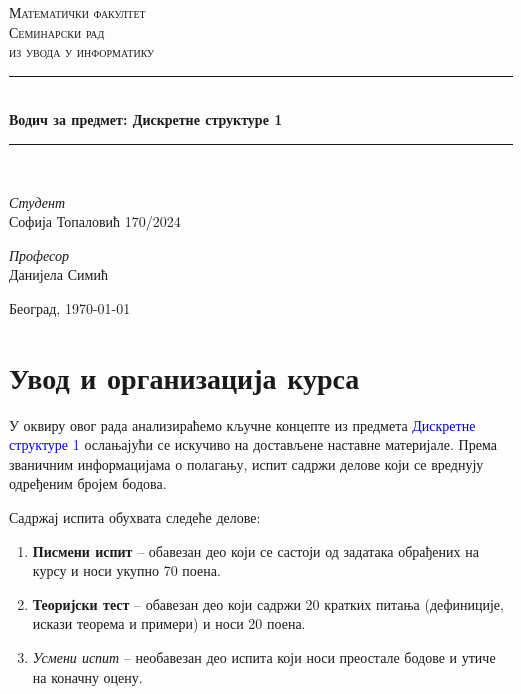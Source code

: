 \documentclass[12pt, a4paper]{article}
\theoremstyle{definition}
\begin{document}
\begin{titlepage}
    \newcommand{\HRule}{\rule{\linewidth}{0.4mm}}
    \center    	
    \textsc{\LARGE Математички факултет}\\[3cm]     	
    \textsc{\Large Семинарски рад}\\[0.1cm]    	
    \textsc{\large из увода у информатику}\\[0.5cm]     	
    \HRule\\[0.4cm]   	
    {\LARGE\bfseries Водич за предмет: Дискретне структуре 1}\\[0.2cm]     	
    \HRule\\[2cm]   
    \vspace{17\baselineskip}
    		 	
    	\begin{minipage}{0.4\textwidth}
    		\begin{flushleft}
    			\large
    			\textit{Студент}\\
    			Софија Топаловић 170/2024
    		\end{flushleft}
    	\end{minipage}
    \hspace*{1cm}
    	\begin{minipage}{0.4\textwidth}
    		\begin{flushright}
    			\large
    			\textit{Професор}\\
    			Данијела Симић
    		\end{flushright}
    	\end{minipage}
    	
    	
    \vfill\vfill\vfill\vfill   	
      {\large Београд, \today}   	
    \vfill  	
    \end{titlepage}

\tableofcontents
\newpage

\section{Увод и организација курса}
У оквиру овог рада анализираћемо кључне концепте из предмета \textcolor{blue}{Дискретне структуре 1} ослањајући се искучиво на достављене наставне материјале. Према званичним информацијама о полагању, испит садржи делове који се вреднују одређеним бројем бодова.

Садржај испита обухвата следеће делове:
\begin{enumerate}
    \item \textbf{Писмени испит} -- обавезан део који се састоји од задатака обрађених на курсу и носи укупно 70 поена.
    \item \textbf{Теоријски тест} -- обавезан део који садржи 20 кратких питања (дефиниције, искази теорема и примери) и носи 20 поена.
    \item \textit{Усмени испит} -- необавезан део испита који носи преостале бодове и утиче на коначну оцену.
\end{enumerate}
\end{document}
